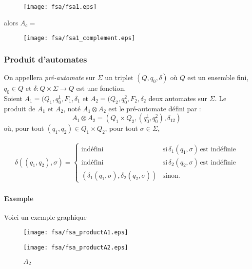 \documentclass[a4paper]{article}
\begin{document}
  \begin{figure}[H]
    \begin{center}
      \texttt{[image: fsa/fsa1.eps]}
    \end{center}
  \end{figure}

  alors $A_c =$

  \begin{figure}[H]
    \begin{center}
      \texttt{[image: fsa/fsa1\_complement.eps]}
    \end{center}
  \end{figure}

  \subsubsection{Produit d'automates}
  On appellera \textit{pré-automate} sur $\Sigma$ un triplet $(Q, q_0, \delta)$
  où $Q$ est un ensemble fini, $q_0 \in Q$ et $\delta : Q \times \Sigma \rightarrow Q$
  est une fonction.\\

  Soient $A_1 = (Q_1, q_0^1, F_1, \delta_1$ et $A_2 = (Q_2, q_0^2, F_2, \delta_2$
  deux automates sur $\Sigma$. Le produit de $A_1$ et $A_2$, noté $A_1 \otimes A_2$
  est le pré-automate défini par : 
  $$ A_1 \otimes A_2 = (Q_1 \times Q_2, (q_0^1, q_0^2), \delta_{12})$$
  où, pour tout $(q_1, q_2) \in Q_1 \times Q_2$, pour tout $\sigma \in \Sigma$,

  \begin{center} 
    \begin{align*} 
     \delta((q_1, q_2), \sigma) = 
      \begin{cases}
        \text{indéfini} & \text{si}\, \delta_1(q_1, \sigma)\, \text{est indéfinie}\\
        \text{indéfini} & \text{si}\, \delta_2(q_2, \sigma)\, \text{est indéfinie}\\
        (\delta_1(q_1, \sigma), \delta_2(q_2, \sigma)) & \text{sinon}.
      \end{cases} 
    \end{align*} 
  \end{center} 

  \paragraph{Exemple} Voici un exemple graphique

  \begin{figure}[H]
    \begin{center}
      \begin{minipage}{0.45\textwidth}
        \texttt{[image: fsa/fsa\_productA1.eps]}
        \caption{$A_1$}
      \end{minipage}\hfill
      \begin{minipage}{0.45\textwidth}
        \texttt{[image: fsa/fsa\_productA2.eps]}
        \caption{$A_2$}
      \end{minipage}
    \end{center}
  \end{figure}
\end{document}

